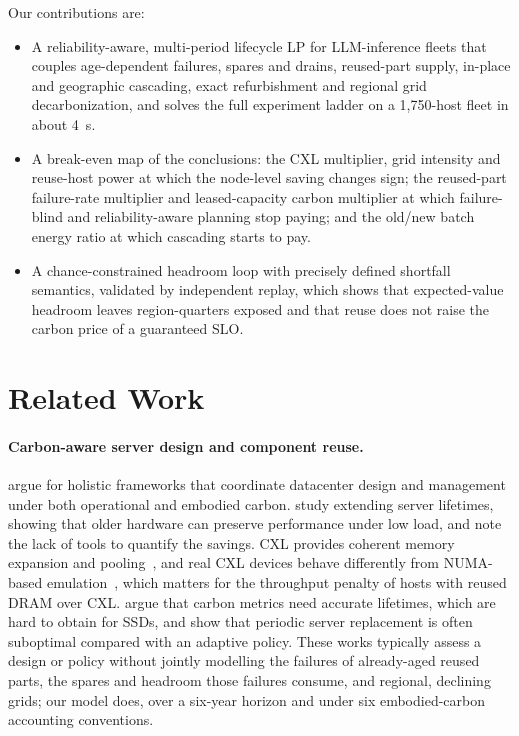 \documentclass{article} %
\begin{document}
Our contributions are:
\begin{itemize}
    \item A reliability-aware, multi-period lifecycle LP for LLM-inference fleets that couples age-dependent failures, spares and drains, reused-part supply, in-place and geographic cascading, exact refurbishment and regional grid decarbonization, and solves the full experiment ladder on a 1,750-host fleet in about 4~s.
    \item A break-even map of the conclusions: the CXL multiplier, grid intensity and reuse-host power at which the node-level saving changes sign; the reused-part failure-rate multiplier and leased-capacity carbon multiplier at which failure-blind and reliability-aware planning stop paying; and the old/new batch energy ratio at which cascading starts to pay.
    \item A chance-constrained headroom loop with precisely defined shortfall semantics, validated by independent replay, which shows that expected-value headroom leaves region-quarters exposed and that reuse does not raise the carbon price of a guaranteed SLO.
\end{itemize}

\section{Related Work}
\label{sec:related_work}
\paragraph{Carbon-aware server design and component reuse.}
\citet{Acun2023CarbonDependencies} argue for holistic frameworks that coordinate datacenter design and management under both operational and embodied carbon. \citet{Wang2023PeelingBack} study extending server lifetimes, showing that older hardware can preserve performance under low load, and note the lack of tools to quantify the savings. CXL provides coherent memory expansion and pooling~\citep{Sharma2024IntroductionCompute}, and real CXL devices behave differently from NUMA-based emulation~\citep{Sun2023DemystifyingCxl}, which matters for the throughput penalty of hosts with reused DRAM over CXL. \citet{Huang2025CaseAccurate} argue that carbon metrics need accurate lifetimes, which are hard to obtain for SSDs, and \citet{Sharma2025TowardOptimal} show that periodic server replacement is often suboptimal compared with an adaptive policy. These works typically assess a design or policy without jointly modelling the failures of already-aged reused parts, the spares and headroom those failures consume, and regional, declining grids; our model does, over a six-year horizon and under six embodied-carbon accounting conventions.
\end{document}
